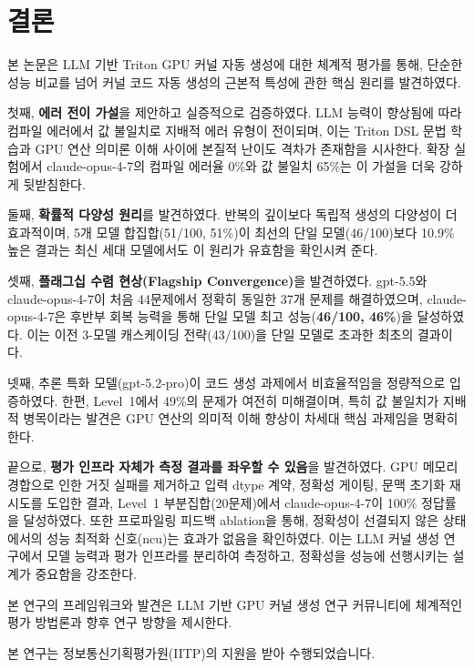 \documentclass[sigplan,screen,review,anonymous]{acmart}
\begin{document}
\section{결론}
\label{sec:conclusion}

본 논문은 LLM 기반 Triton GPU 커널 자동 생성에 대한 체계적 평가를 통해, 단순한 성능 비교를 넘어 커널 코드 자동 생성의 근본적 특성에 관한 핵심 원리를 발견하였다.

첫째, \textbf{에러 전이 가설}을 제안하고 실증적으로 검증하였다. LLM 능력이 향상됨에 따라 컴파일 에러에서 값 불일치로 지배적 에러 유형이 전이되며, 이는 Triton DSL 문법 학습과 GPU 연산 의미론 이해 사이에 본질적 난이도 격차가 존재함을 시사한다. 확장 실험에서 claude-opus-4-7의 컴파일 에러율 0\%와 값 불일치 65\%는 이 가설을 더욱 강하게 뒷받침한다.

둘째, \textbf{확률적 다양성 원리}를 발견하였다. 반복의 깊이보다 독립적 생성의 다양성이 더 효과적이며, 5개 모델 합집합(51/100, 51\%)이 최선의 단일 모델(46/100)보다 10.9\% 높은 결과는 최신 세대 모델에서도 이 원리가 유효함을 확인시켜 준다.

셋째, \textbf{플래그십 수렴 현상(Flagship Convergence)}을 발견하였다. gpt-5.5와 claude-opus-4-7이 처음 44문제에서 정확히 동일한 37개 문제를 해결하였으며, claude-opus-4-7은 후반부 회복 능력을 통해 단일 모델 최고 성능(\textbf{46/100, 46\%})을 달성하였다. 이는 이전 3-모델 캐스케이딩 전략(43/100)을 단일 모델로 초과한 최초의 결과이다.

넷째, 추론 특화 모델(gpt-5.2-pro)이 코드 생성 과제에서 비효율적임을 정량적으로 입증하였다. 한편, Level~1에서 49\%의 문제가 여전히 미해결이며, 특히 값 불일치가 지배적 병목이라는 발견은 GPU 연산의 의미적 이해 향상이 차세대 핵심 과제임을 명확히 한다.

끝으로, \textbf{평가 인프라 자체가 측정 결과를 좌우할 수 있음}을 발견하였다. GPU 메모리 경합으로 인한 거짓 실패를 제거하고 입력 dtype 계약, 정확성 게이팅, 문맥 초기화 재시도를 도입한 결과, Level~1 부분집합(20문제)에서 claude-opus-4-7이 100\% 정답률을 달성하였다. 또한 프로파일링 피드백 ablation을 통해, 정확성이 선결되지 않은 상태에서의 성능 최적화 신호(ncu)는 효과가 없음을 확인하였다. 이는 LLM 커널 생성 연구에서 모델 능력과 평가 인프라를 분리하여 측정하고, 정확성을 성능에 선행시키는 설계가 중요함을 강조한다.

본 연구의 프레임워크와 발견은 LLM 기반 GPU 커널 생성 연구 커뮤니티에 체계적인 평가 방법론과 향후 연구 방향을 제시한다.


\begin{acks}
본 연구는 정보통신기획평가원(IITP)의 지원을 받아 수행되었습니다.
\end{acks}

\clearpage
\newpage



\end{document}
